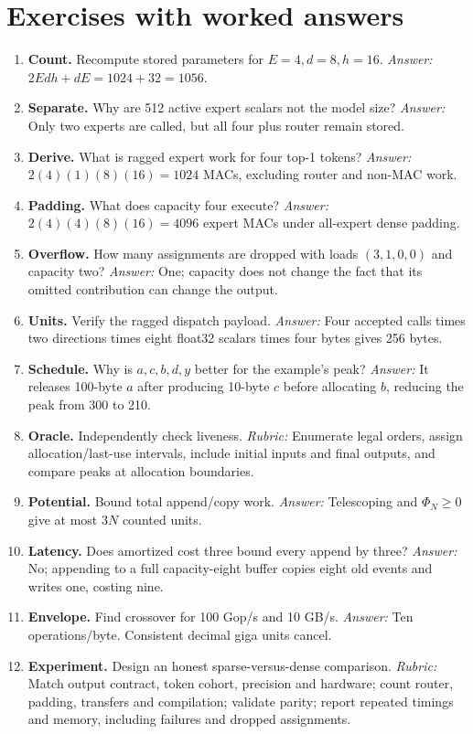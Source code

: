 \section{Exercises with worked answers}
\begin{enumerate}
\item \textbf{Count.} Recompute stored parameters for $E=4,d=8,h=16$.
\emph{Answer:} $2Edh+dE=1024+32=1056$.
\item \textbf{Separate.} Why are 512 active expert scalars not the model size?
\emph{Answer:} Only two experts are called, but all four plus router remain stored.
\item \textbf{Derive.} What is ragged expert work for four top-1 tokens?
\emph{Answer:} $2(4)(1)(8)(16)=1024$ MACs, excluding router and non-MAC work.
\item \textbf{Padding.} What does capacity four execute?
\emph{Answer:} $2(4)(4)(8)(16)=4096$ expert MACs under all-expert dense padding.
\item \textbf{Overflow.} How many assignments are dropped with loads $(3,1,0,0)$
and capacity two? \emph{Answer:} One; capacity does not change the fact that its
omitted contribution can change the output.
\item \textbf{Units.} Verify the ragged dispatch payload.
\emph{Answer:} Four accepted calls times two directions times eight float32 scalars
times four bytes gives 256 bytes.
\item \textbf{Schedule.} Why is $a,c,b,d,y$ better for the example's peak?
\emph{Answer:} It releases 100-byte $a$ after producing 10-byte $c$ before
allocating $b$, reducing the peak from 300 to 210.
\item \textbf{Oracle.} Independently check liveness.
\emph{Rubric:} Enumerate legal orders, assign allocation/last-use intervals,
include initial inputs and final outputs, and compare peaks at allocation boundaries.
\item \textbf{Potential.} Bound total append/copy work.
\emph{Answer:} Telescoping and $\Phi_N\geq0$ give at most $3N$ counted units.
\item \textbf{Latency.} Does amortized cost three bound every append by three?
\emph{Answer:} No; appending to a full capacity-eight buffer copies eight old events
and writes one, costing nine.
\item \textbf{Envelope.} Find crossover for 100 Gop/s and 10 GB/s.
\emph{Answer:} Ten operations/byte. Consistent decimal giga units cancel.
\item \textbf{Experiment.} Design an honest sparse-versus-dense comparison.
\emph{Rubric:} Match output contract, token cohort, precision and hardware; count
router, padding, transfers and compilation; validate parity; report repeated
timings and memory, including failures and dropped assignments.
\end{enumerate}
